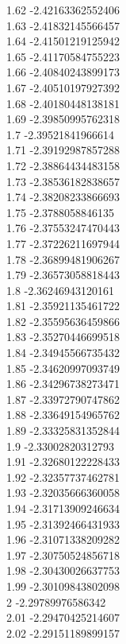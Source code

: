 {1.62	-2.42163362552406\\
1.63	-2.41832145566457\\
1.64	-2.41501219125942\\
1.65	-2.41170584755223\\
1.66	-2.40840243899173\\
1.67	-2.40510197927392\\
1.68	-2.40180448138181\\
1.69	-2.39850995762318\\
1.7	-2.39521841966614\\
1.71	-2.39192987857288\\
1.72	-2.38864434483158\\
1.73	-2.38536182838657\\
1.74	-2.38208233866693\\
1.75	-2.3788058846135\\
1.76	-2.37553247470443\\
1.77	-2.37226211697944\\
1.78	-2.36899481906267\\
1.79	-2.36573058818443\\
1.8	-2.36246943120161\\
1.81	-2.35921135461722\\
1.82	-2.35595636459866\\
1.83	-2.35270446699518\\
1.84	-2.34945566735432\\
1.85	-2.34620997093749\\
1.86	-2.34296738273471\\
1.87	-2.33972790747862\\
1.88	-2.33649154965762\\
1.89	-2.33325831352844\\
1.9	-2.33002820312793\\
1.91	-2.32680122228433\\
1.92	-2.32357737462781\\
1.93	-2.32035666360058\\
1.94	-2.31713909246634\\
1.95	-2.31392466431933\\
1.96	-2.31071338209282\\
1.97	-2.30750524856718\\
1.98	-2.30430026637753\\
1.99	-2.30109843802098\\
2	-2.29789976586342\\
2.01	-2.29470425214607\\
2.02	-2.29151189899157\\
}
